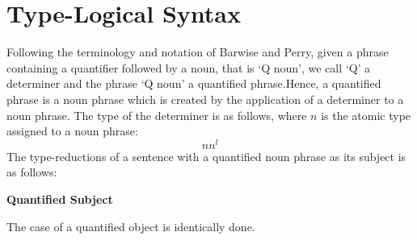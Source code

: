 \section{Type-Logical Syntax}

Following the terminology and notation of Barwise and  Perry, given a phrase containing a quantifier followed by a noun, that is `Q noun', we call `Q' a determiner and the phrase `Q noun' a quantified  phrase.Hence,  a quantified phrase is a noun phrase which is created by the application of a determiner to a noun phrase.  The type of the determiner is as follows, where $n$ is the atomic type assigned to a noun phrase:
\[
n n^l
\]
The  type-reductions of a sentence with a quantified noun phrase as its  subject is as follows:

\begin{center}
{\bf Quantified Subject}\qquad  {} 
\end{center}

The case of a quantified object is identically done. 



